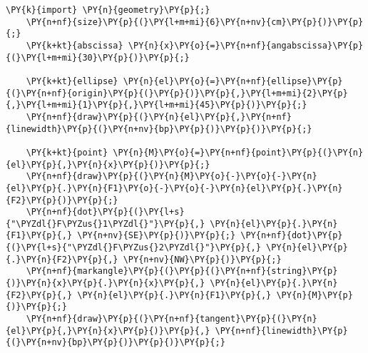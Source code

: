 \begin{Verbatim}[commandchars=\\\{\}]
    \PY{k}{import} \PY{n}{geometry}\PY{p}{;}
    \PY{n+nf}{size}\PY{p}{(}\PY{l+m+mi}{6}\PY{n+nv}{cm}\PY{p}{)}\PY{p}{;}
    \PY{k+kt}{abscissa} \PY{n}{x}\PY{o}{=}\PY{n+nf}{angabscissa}\PY{p}{(}\PY{l+m+mi}{30}\PY{p}{)}\PY{p}{;}

    \PY{k+kt}{ellipse} \PY{n}{el}\PY{o}{=}\PY{n+nf}{ellipse}\PY{p}{(}\PY{n+nf}{origin}\PY{p}{(}\PY{p}{)}\PY{p}{,}\PY{l+m+mi}{2}\PY{p}{,}\PY{l+m+mi}{1}\PY{p}{,}\PY{l+m+mi}{45}\PY{p}{)}\PY{p}{;}
    \PY{n+nf}{draw}\PY{p}{(}\PY{n}{el}\PY{p}{,}\PY{n+nf}{linewidth}\PY{p}{(}\PY{n+nv}{bp}\PY{p}{)}\PY{p}{)}\PY{p}{;}

    \PY{k+kt}{point} \PY{n}{M}\PY{o}{=}\PY{n+nf}{point}\PY{p}{(}\PY{n}{el}\PY{p}{,}\PY{n}{x}\PY{p}{)}\PY{p}{;}
    \PY{n+nf}{draw}\PY{p}{(}\PY{n}{M}\PY{o}{-}\PY{o}{-}\PY{n}{el}\PY{p}{.}\PY{n}{F1}\PY{o}{-}\PY{o}{-}\PY{n}{el}\PY{p}{.}\PY{n}{F2}\PY{p}{)}\PY{p}{;}
    \PY{n+nf}{dot}\PY{p}{(}\PY{l+s}{"\PYZdl{}F\PYZus{}1\PYZdl{}"}\PY{p}{,} \PY{n}{el}\PY{p}{.}\PY{n}{F1}\PY{p}{,} \PY{n+nv}{SE}\PY{p}{)}\PY{p}{;} \PY{n+nf}{dot}\PY{p}{(}\PY{l+s}{"\PYZdl{}F\PYZus{}2\PYZdl{}"}\PY{p}{,} \PY{n}{el}\PY{p}{.}\PY{n}{F2}\PY{p}{,} \PY{n+nv}{NW}\PY{p}{)}\PY{p}{;}
    \PY{n+nf}{markangle}\PY{p}{(}\PY{p}{(}\PY{n+nf}{string}\PY{p}{)}\PY{n}{x}\PY{p}{.}\PY{n}{x}\PY{p}{,} \PY{n}{el}\PY{p}{.}\PY{n}{F2}\PY{p}{,} \PY{n}{el}\PY{p}{.}\PY{n}{F1}\PY{p}{,} \PY{n}{M}\PY{p}{)}\PY{p}{;}
    \PY{n+nf}{draw}\PY{p}{(}\PY{n+nf}{tangent}\PY{p}{(}\PY{n}{el}\PY{p}{,}\PY{n}{x}\PY{p}{)}\PY{p}{,} \PY{n+nf}{linewidth}\PY{p}{(}\PY{n+nv}{bp}\PY{p}{)}\PY{p}{)}\PY{p}{;}
\end{Verbatim}
